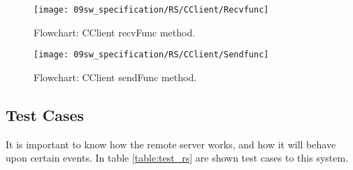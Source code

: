 \begin{figure}[H]
	\centering
	\texttt{[image: 09sw\_specification/RS/CClient/Recvfunc]}
	\caption{Flowchart: CClient recvFunc method.}
	\label{fig:RSrecvfunc}
\end{figure}

\begin{figure}[H]
	\centering
	\texttt{[image: 09sw\_specification/RS/CClient/Sendfunc]}
	\caption{Flowchart: CClient sendFunc method.}
	\label{fig:RSsendfunc}
\end{figure}

\clearpage
\subsection{Test Cases}
It is important to know how the remote server works, and how it will behave upon certain events. In table \ref{table:test_rs} are shown test cases to this system.


